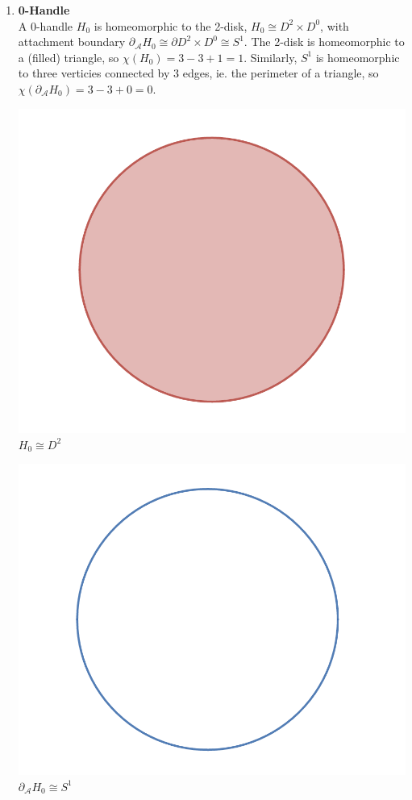 \documentclass[12pt]{article}
\newcommand{\cA}{{\mathcal A}}
\theoremstyle{definition}
\begin{document}
\begin{enumerate}
      \item \textbf{0-Handle}\\
            A 0-handle $H_0$ is homeomorphic to the 2-disk, $H_0 \cong D^2 \times D^0$, with attachment boundary $\partial_\cA H_0 \cong \partial D^2 \times D^0 \cong S^1$. The 2-disk is homeomorphic to a (filled) triangle, so $\chi(H_0) = 3 - 3 + 1 = 1$. Similarly, $S^1$ is homeomorphic to three verticies connected by 3 edges, ie. the perimeter of a triangle, so $\chi(\partial_\cA H_0) = 3-3+0 = 0$. 
            \begin{center}
                  \includegraphics[scale=0.5]{H_0.png} \\
                  $H_0 \cong D^2$

                  \includegraphics[scale = 0.5]{D H_0.png}\\
                  $\partial_\cA H_0 \cong S^1$
                  

\end{center}
\end{enumerate}
\end{document}
